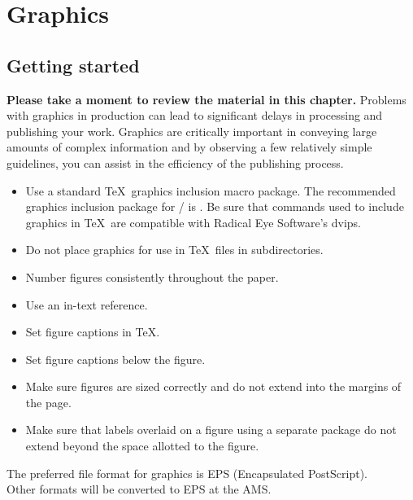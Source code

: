 
\chapter{Graphics}\label{ch:graphics}

\section{Getting started}

\noindent \textbf{Please take a moment to review the material in this
 chapter.} Problems with graphics in production can lead to significant
 delays in processing and publishing your work. Graphics are critically
 important in conveying large amounts of complex information and by
 observing a few relatively simple guidelines, you can assist in the
 efficiency of the publishing process.

\begin{itemize}
\item Use a standard \TeX\ graphics inclusion macro package.
 The recommended graphics inclusion package for \latexe/ is .
 Be sure that commands used to include graphics in \TeX\ are compatible
 with Radical Eye Software's dvips.
\item Do not place graphics for use in \TeX\ files in subdirectories.
\item Number figures consistently throughout the paper.
\item Use an in-text reference.
\item Set figure captions in \TeX.
\item Set figure captions below the figure.
\item Make sure figures are sized correctly and do not extend into the
  margins of the page.
\item Make sure that labels overlaid on a figure using a separate
  package do not extend beyond the space allotted to the figure.
\end{itemize}

%
{The preferred file format for graphics is EPS (Encapsulated PostScript).\\
Other formats will be converted to EPS at the AMS.}

